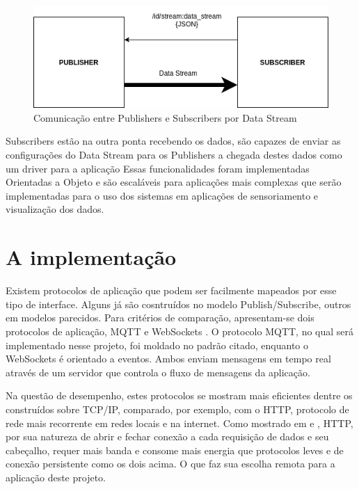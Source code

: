 \begin{figure}[h!]
\centering
\includegraphics[width=12cm]{./02_Capitulos/02_Cap3/figures/publisher-subscriber_comm}
\caption{Comunicação entre Publishers e Subscribers por Data Stream}
\label{fig:3.2.0/pub_sub}
\end{figure}

Subscribers estão na outra ponta recebendo os dados, são capazes de enviar as configurações do Data Stream para os Publishers a chegada destes dados como um driver para a aplicação
Essas funcionalidades foram implementadas Orientadas a Objeto e são escaláveis para aplicações mais complexas que serão implementadas para o uso dos sistemas em aplicações de sensoriamento e visualização dos dados.

\section{A implementação}
\label{section:implementacao}

Existem protocolos de aplicação que podem ser facilmente mapeados por esse tipo de interface. Alguns já são cosntruídos no modelo Publish/Subscribe, outros em modelos parecidos. Para critérios de comparação, apresentam-se dois protocolos de aplicação, MQTT e WebSockets \cite{websocket}. O protocolo MQTT, no qual será implementado nesse projeto, foi moldado no padrão citado, enquanto o WebSockets é orientado a eventos. Ambos enviam mensagens em tempo real através de um servidor que controla o fluxo de mensagens da aplicação.

Na questão de desempenho, estes protocolos se mostram mais eficientes dentre os construídos sobre TCP/IP, comparado, por exemplo, com o HTTP, protocolo de rede mais recorrente em redes locais e na internet. Como mostrado em \cite{Tetsuya-Sasaki} e \cite{Naik}, HTTP, por sua natureza de abrir e fechar conexão a cada requisição de dados e seu cabeçalho, requer mais banda e consome mais energia que protocolos leves e de conexão persistente como os dois acima. O que faz sua escolha remota para a aplicação deste projeto.


